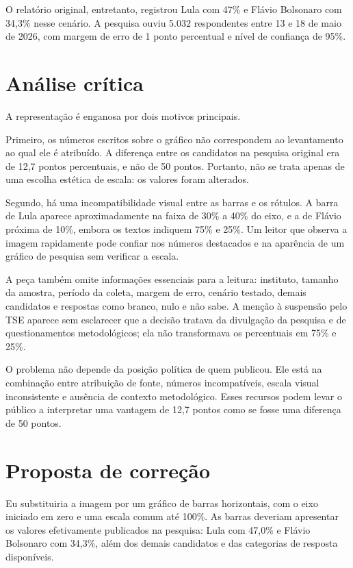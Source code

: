 \documentclass[12pt,a4paper]{article}
\begin{document}
O relatório original, entretanto, registrou Lula com 47\% e Flávio Bolsonaro
com 34,3\% nesse cenário. A pesquisa ouviu 5.032 respondentes entre 13 e 18 de
maio de 2026, com margem de erro de 1 ponto percentual e nível de confiança de
95\%.

\section{Análise crítica}

A representação é enganosa por dois motivos principais.

Primeiro, os números escritos sobre o gráfico não correspondem ao levantamento
ao qual ele é atribuído. A diferença entre os candidatos na pesquisa original
era de 12,7 pontos percentuais, e não de 50 pontos. Portanto, não se trata
apenas de uma escolha estética de escala: os valores foram alterados.

Segundo, há uma incompatibilidade visual entre as barras e os rótulos. A barra
de Lula aparece aproximadamente na faixa de 30\% a 40\% do eixo, e a de Flávio
próxima de 10\%, embora os textos indiquem 75\% e 25\%. Um leitor que observa a
imagem rapidamente pode confiar nos números destacados e na aparência de um
gráfico de pesquisa sem verificar a escala.

A peça também omite informações essenciais para a leitura: instituto, tamanho
da amostra, período da coleta, margem de erro, cenário testado, demais
candidatos e respostas como branco, nulo e não sabe. A menção à suspensão pelo
TSE aparece sem esclarecer que a decisão tratava da divulgação da pesquisa e de
questionamentos metodológicos; ela não transformava os percentuais em 75\% e
25\%.

O problema não depende da posição política de quem publicou. Ele está na
combinação entre atribuição de fonte, números incompatíveis, escala visual
inconsistente e ausência de contexto metodológico. Esses recursos podem levar
o público a interpretar uma vantagem de 12,7 pontos como se fosse uma diferença
de 50 pontos.

\section{Proposta de correção}

Eu substituiria a imagem por um gráfico de barras horizontais, com o eixo
iniciado em zero e uma escala comum até 100\%. As barras deveriam apresentar os
valores efetivamente publicados na pesquisa: Lula com 47,0\% e Flávio Bolsonaro
com 34,3\%, além dos demais candidatos e das categorias de resposta disponíveis.
\end{document}
